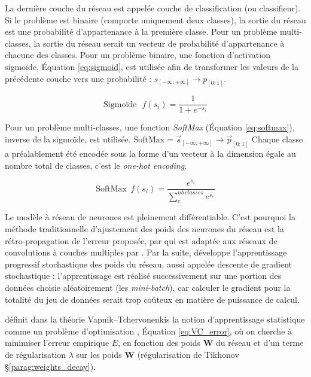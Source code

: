 La dernière couche du réseau est appelée couche de classification (ou classifieur).
Si le problème est binaire (comporte uniquement deux classes), la sortie du réseau est une probabilité d'appartenance à la première classe.
Pour un problème multi-classes, la sortie du réseau serait un vecteur de probabilité d'appartenance à chacune des classes.
Pour un problème binaire, une fonction d'activation sigmoïde, Équation \ref{eq:sigmoid}, est utilisée afin de transformer les valeurs de la précédente couche vers une probabilité : $s_{[-\infty; +\infty]} \to p_{[0 ; 1]}$.

\begin{equation} \label{eq:sigmoid}
\text{Sigmoïde} \ \ \ f\left(s_{i}\right)=\frac{1}{1+e^{-s_{i}}}
\end{equation}

Pour un problème multi-classes, une fonction \textit{SoftMax} (Équation \ref{eq:softmax}), inverse de la sigmoïde, est utilisée.
$\text{SoftMax} = \vec{s}_{[-\infty; +\infty]} \to \vec{p}_{[0 ; 1]}$
Chaque classe a préalablement été encodée sous la forme d'un vecteur à la dimension égale au nombre total de classes, c'est le \textit{one-hot encoding}.

\begin{equation} \label{eq:softmax}
\text{SoftMax} \ \ f(s_{i})=\frac{e^{s_{i}}}{\sum_{c}^{nb \ classes} e^{s_{c}}}
\end{equation}


Le modèle à réseau de neurones est pleinement différentiable.
C'est pourquoi la méthode traditionnelle d'ajustement des poids des neurones du réseau est la rétro-propagation de l'erreur proposée, par \citeauthor{rumelhart_learning_1985} \cite{rumelhart_learning_1985} qui est adaptée aux réseaux de convolutions à couches multiples par \citeauthor{lecun_backpropagation_1989} \cite{lecun_backpropagation_1989}.
Par la suite, \citeauthor{lecun_efficient_1998} \cite{lecun_efficient_1998} développe l'apprentissage progressif stochastique des poids du réseau, aussi appelée descente de gradient stochastique : l'apprentissage est réalisé successivement sur une portion des données choisie aléatoirement  (les \textit{mini-batch}), car  calculer le gradient pour la totalité du jeu de données serait trop coûteux en matière de puissance de calcul.

\citeauthor{vapnik_principles_1992} définit dans la théorie Vapnik–Tchervonenkis la notion d'apprentissage statistique comme un problème d'optimisation \cite{vapnik_principles_1992}, Équation \ref{eq:VC_error}, où on cherche à minimiser l'erreur empirique $E$, en fonction des poids $\mathbf{W}$ du réseau et d'un terme de régularisation $\lambda$ sur les poids $\mathbf{W}$ (régularisation de Tikhonov §\ref{parag:weights_decay}).

